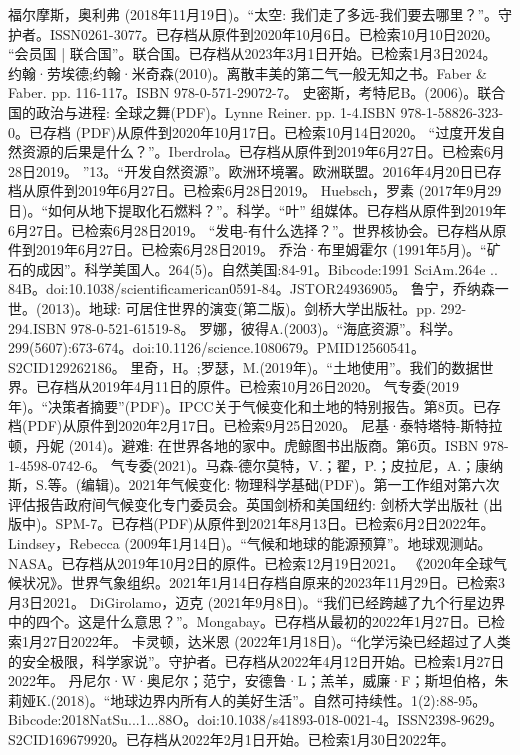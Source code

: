 \begin{enumerate}
 福尔摩斯，奥利弗 (2018年11月19日)。“太空: 我们走了多远-我们要去哪里？”。守护者。ISSN0261-3077。已存档从原件到2020年10月6日。已检索10月10日2020。 
 “会员国 | 联合国”。联合国。已存档从2023年3月1日开始。已检索1月3日2024。
 约翰·劳埃德;约翰·米奇森(2010)。离散丰美的第二气一般无知之书。Faber & Faber. pp. 116-117。ISBN 978-0-571-29072-7。
 史密斯，考特尼B。(2006)。联合国的政治与进程: 全球之舞(PDF)。Lynne Reiner. pp. 1-4.ISBN  978-1-58826-323-0。已存档 (PDF)从原件到2020年10月17日。已检索10月14日2020。
 “过度开发自然资源的后果是什么？”。Iberdrola。已存档从原件到2019年6月27日。已检索6月28日2019。
 ”13。“开发自然资源”。欧洲环境署。欧洲联盟。2016年4月20日已存档从原件到2019年6月27日。已检索6月28日2019。
 Huebsch，罗素 (2017年9月29日)。“如何从地下提取化石燃料？”。科学。“叶” 组媒体。已存档从原件到2019年6月27日。已检索6月28日2019。
 “发电-有什么选择？”。世界核协会。已存档从原件到2019年6月27日。已检索6月28日2019。
 乔治·布里姆霍尔 (1991年5月)。“矿石的成因”。科学美国人。264(5)。自然美国:84-91。Bibcode:1991 SciAm.264e .. 84B。doi:10.1038/scientificamerican0591-84。JSTOR24936905。 
 鲁宁，乔纳森一世。(2013)。地球: 可居住世界的演变(第二版)。剑桥大学出版社。pp. 292-294.ISBN 978-0-521-61519-8。
 罗娜，彼得A.(2003)。“海底资源”。科学。299(5607):673-674。doi:10.1126/science.1080679。PMID12560541。S2CID129262186。  
 里奇，H。;罗瑟，M.(2019年)。“土地使用”。我们的数据世界。已存档从2019年4月11日的原件。已检索10月26日2020。
 气专委(2019年)。“决策者摘要”(PDF)。IPCC关于气候变化和土地的特别报告。第8页。已存档(PDF)从原件到2020年2月17日。已检索9月25日2020。
 尼基·泰特塔特-斯特拉顿，丹妮 (2014)。避难: 在世界各地的家中。虎鲸图书出版商。第6页。ISBN 978-1-4598-0742-6。
 气专委(2021)。马森-德尔莫特，V.；翟，P.；皮拉尼，A.；康纳斯，S.等。(编辑)。2021年气候变化: 物理科学基础(PDF)。第一工作组对第六次评估报告政府间气候变化专门委员会。英国剑桥和美国纽约: 剑桥大学出版社 (出版中)。SPM-7。已存档(PDF)从原件到2021年8月13日。已检索6月2日2022年。
 Lindsey，Rebecca (2009年1月14日)。“气候和地球的能源预算”。地球观测站。NASA。已存档从2019年10月2日的原件。已检索12月19日2021。
 《2020年全球气候状况》。世界气象组织。2021年1月14日存档自原来的2023年11月29日。已检索3月3日2021。
 DiGirolamo，迈克 (2021年9月8日)。“我们已经跨越了九个行星边界中的四个。这是什么意思？”。Mongabay。已存档从最初的2022年1月27日。已检索1月27日2022年。
 卡灵顿，达米恩 (2022年1月18日)。“化学污染已经超过了人类的安全极限，科学家说”。守护者。已存档从2022年4月12日开始。已检索1月27日2022年。
 丹尼尔·W·奥尼尔；范宁，安德鲁·L；羔羊，威廉·F；斯坦伯格，朱莉娅K.(2018)。“地球边界内所有人的美好生活”。自然可持续性。1(2):88-95。Bibcode:2018NatSu...1...88O。doi:10.1038/s41893-018-0021-4。ISSN2398-9629。S2CID169679920。已存档从2022年2月1日开始。已检索1月30日2022年。  

\end{enumerate}
